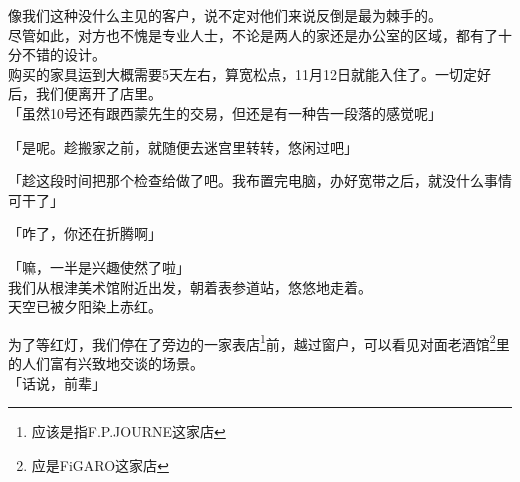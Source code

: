 像我们这种没什么主见的客户，说不定对他们来说反倒是最为棘手的。\\

尽管如此，对方也不愧是专业人士，不论是两人的家还是办公室的区域，都有了十分不错的设计。\\

购买的家具运到大概需要5天左右，算宽松点，11月12日就能入住了。一切定好后，我们便离开了店里。\\

「虽然10号还有跟西蒙先生的交易，但还是有一种告一段落的感觉呢」

「是呢。趁搬家之前，就随便去迷宫里转转，悠闲过吧」

「趁这段时间把那个检查给做了吧。我布置完电脑，办好宽带之后，就没什么事情可干了」

「咋了，你还在折腾啊」

「嘛，一半是兴趣使然了啦」\\

我们从根津美术馆附近出发，朝着表参道站，悠悠地走着。\\

天空已被夕阳染上赤红。

为了等红灯，我们停在了旁边的一家表店\footnote{应该是指F.P.JOURNE这家店}前，越过窗户，可以看见对面老酒馆\footnote{应是FiGARO这家店}里的人们富有兴致地交谈的场景。\\

「话说，前辈」

